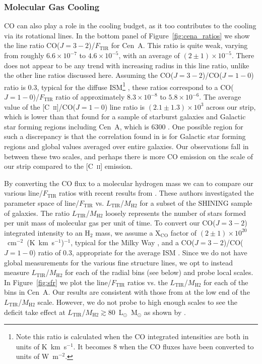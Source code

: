 \documentclass[preprint2]{aastex}
\begin{document}
\subsubsection{Molecular Gas Cooling}
CO can also play a role in the cooling budget, as it too contributes to the cooling via its rotational lines.  In the bottom panel of Figure~\ref{fig:cena_ratios} we show the line ratio CO($J=3-2$)/$F_{\mathrm{TIR}}$ for Cen~A.  This ratio is quite weak, varying from roughly $6.6 \times 10^{-7}$ to $4.6 \times 10^{-5}$, with an average of $(2 \pm 1) \times 10^{-5}$.  There does not appear to be any trend with increasing radius in this line ratio, unlike the other line ratios discussed here.  Assuming the CO($J=3-2$)/CO($J=1-0$) ratio is 0.3, typical for the diffuse ISM\footnote{Note this ratio is calculated when the CO integrated intensities are both in units of K~km~s$^{-1}$.  It becomes 8 when the CO fluxes have been converted to units of W~m$^{-2}$.} \citep{2009ApJ...693.1736W}, these ratios correspond to a CO($J=1-0$)/$F_{\mathrm{TIR}}$ ratio of approximately $8.3 \times 10^{-8}$ to $5.8 \times 10^{-6}$.  The average value of the [C~\textsc{ii}]/CO($J=1-0$) line ratio is $(2.1 \pm 1.3) \times 10^{3}$ across our strip, which is lower than that found for a sample of starburst galaxies and Galactic star forming regions including Cen~A, which is 6300 \citep{1991ApJ...373..423S}.  One possible region for such a discrepancy is that the correlation found in \citet{1991ApJ...373..423S} is for Galactic star forming regions and global values averaged over entire galaxies.  Our observations fall in between these two scales, and perhaps there is more CO emission on the scale of our strip compared to the [C~\textsc{ii}] emission.

By converting the CO flux to a molecular hydrogen mass we can to compare our various line/$F_{\mathrm{TIR}}$ ratios with recent results from \citet{2011ApJ...728L...7G}.  These authors investigated the parameter space of line/$F_{\mathrm{TIR}}$ vs. $L_{\mathrm{TIR}}$/$M_{\mathrm{H}2}$ for a subset of the SHINING sample of galaxies.  The ratio $L_{\mathrm{TIR}}$/$M_{\mathrm{H}2}$ loosely represents the number of stars formed per unit mass of molecular gas per unit of time.  To convert our CO($J=3-2$) integrated intensity to an H$_{2}$ mass, we assume a X$_{\mathrm{CO}}$ factor of $(2 \pm 1) \times 10^{20}$~cm$^{-2}$~(K~km~s$^{-1}$)$^{-1}$, typical for the Milky Way \citep{1988A&A...207....1S}, and a CO($J=3-2$)/CO($J=1-0$) ratio of 0.3, appropriate for the average ISM \citep{2009ApJ...693.1736W}.  Since we do not have global measurements for the various fine structure lines, we opt to instead measure $L_{\mathrm{TIR}}$/$M_{\mathrm{H}2}$ for each of the radial bins (see below) and probe local scales.  In Figure~\ref{fig:sfr} we plot the line/$F_{\mathrm{TIR}}$ ratios vs. the $L_{\mathrm{TIR}}$/$M_{\mathrm{H}2}$ for each of the bins in Cen~A.  Our results are consistent with those from \citet{2011ApJ...728L...7G} at the low end of the $L_{\mathrm{TIR}}$/$M_{\mathrm{H}2}$ scale.  However, we do not probe to high enough scales to see the deficit take effect at $L_{\mathrm{TIR}}$/$M_{\mathrm{H}2} \gtrsim 80$~L$_{\odot}$~M$_{\odot}$ as shown by \citet{2011ApJ...728L...7G}. 
\end{document}
